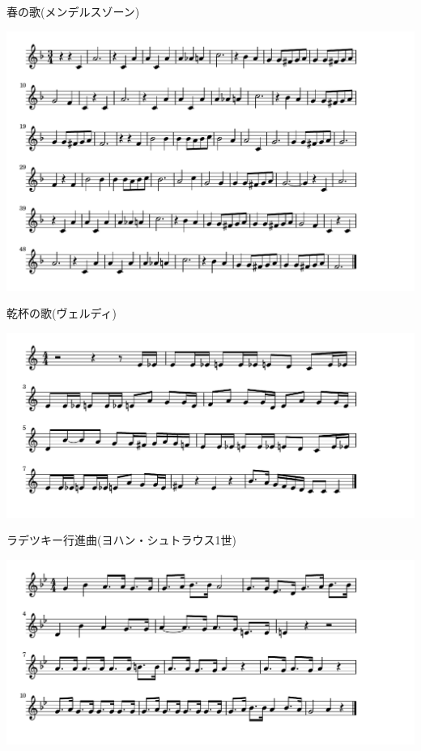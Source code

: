 \documentclass[a4paper]{ltjsarticle}
\begin{document}
\vspace{-10mm} \hspace{10mm}
春の歌(メンデルスゾーン)

\includegraphics[clip]{kanpai_crop.pdf}

\vspace{-10mm} \hspace{10mm}
乾杯の歌(ヴェルディ)

\includegraphics[clip]{radetzky_crop.pdf}

\vspace{-10mm} \hspace{10mm}
ラデツキー行進曲(ヨハン・シュトラウス1世)

\includegraphics[clip]{zuizui_crop.pdf}
\end{document}
